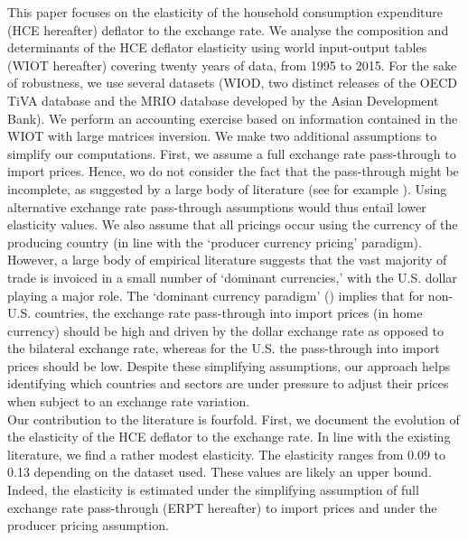 \documentclass[12pt,a4paper]{article}
\begin{document}
This paper focuses on the elasticity of the household consumption expenditure (HCE hereafter) deflator to the exchange rate. 
We analyse the composition and determinants of the HCE deflator elasticity using world input-output tables (WIOT hereafter) covering twenty years of data, from 1995 to 2015.
For the sake of robustness, we use several datasets (WIOD, two distinct releases of the OECD TiVA database and the MRIO database developed by the Asian Development Bank). 
We perform an accounting exercise based on information contained in the WIOT with large matrices inversion. 
We make two additional assumptions to simplify our computations. 
First, we assume a full exchange rate pass-through to import prices. 
Hence, wo do not consider the fact that the pass-through might be incomplete, as suggested by a large body of literature (see for example \cite{Berman2012}).
Using alternative exchange rate pass-through assumptions would thus entail lower elasticity values. 
We also assume that all pricings occur using the currency of the producing country (in line with the ‘producer currency pricing’ paradigm). 
However, a large body of empirical literature suggests that the vast majority of trade is invoiced in a small number of ‘dominant currencies,’ with the U.S. dollar playing a major role. 
The ‘dominant currency paradigm’ (\cite{Gopinath2020}) implies that for non-U.S. countries, the exchange rate pass-through into import prices (in home currency) should be high and driven by the dollar exchange rate as opposed to the bilateral exchange rate, whereas for the U.S. the pass-through into import prices should be low.
Despite these simplifying assumptions, our approach helps identifying which countries and sectors are under pressure to adjust their prices when subject to an exchange rate variation.\\
Our contribution to the literature is fourfold. 
First, we document the evolution of the elasticity of the HCE deflator to the exchange rate.
In line with the existing literature, we find a rather modest elasticity. 
The elasticity ranges from 0.09 to 0.13 depending on the dataset used.
These values are likely an upper bound. 
Indeed, the elasticity is estimated under the simplifying assumption of full exchange rate pass-through (ERPT hereafter) to import prices and under the producer pricing assumption.
\end{document}
